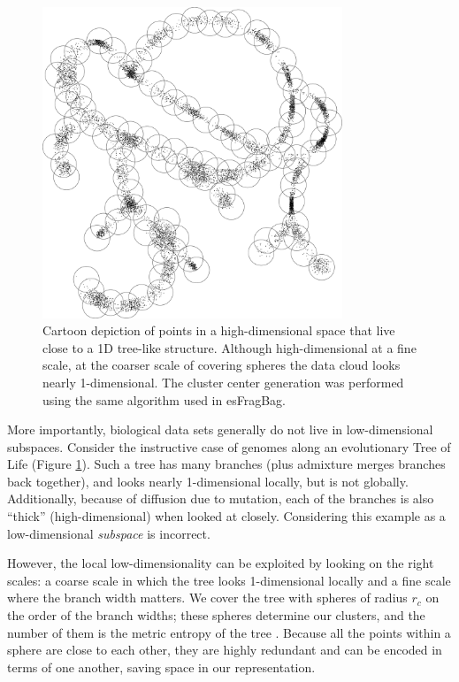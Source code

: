 \documentclass[review,preprint,12pt]{elsarticle}
\renewcommand{\cite}{\citep} %
\theoremstyle{definition}
\theoremstyle{remark}
\numberwithin{equation}{section}
\begin{document}
\begin{figure}[btp]
    \centering
    \includegraphics[width=0.8\textwidth]{assets/treepoints/treepoints2D_clusters.png}
    \caption{Cartoon depiction of points in a high-dimensional space that live close to a 1D tree-like structure. Although high-dimensional at a fine scale, at the coarser scale of covering spheres the data cloud looks nearly 1-dimensional. The cluster center generation was performed using the same algorithm used in esFragBag.}
    \label{fig:tree}
\end{figure}
More importantly, biological data sets generally do not live in low-dimensional subspaces.
Consider the instructive case of genomes along an evolutionary Tree of Life (Figure \ref{fig:tree}).
Such a tree has many branches (plus admixture merges branches back together), and looks nearly 1-dimensional locally, but is not globally.
Additionally, because of diffusion due to mutation, each of the branches is also ``thick'' (high-dimensional) when looked at closely.
Considering this example as a low-dimensional \textit{subspace} is incorrect.

However, the local low-dimensionality can be exploited by looking on the right scales: a coarse scale in which the tree looks 1-dimensional locally and a fine scale where the branch width matters.
We cover the tree with spheres of radius $r_c$ on the order of the branch widths; these spheres determine our clusters, and the number of them is the metric entropy of the tree \cite{tao2008product}.
Because all the points within a sphere are close to each other, they are highly redundant and can be encoded in terms of one another, saving space in our representation.
\end{document}

